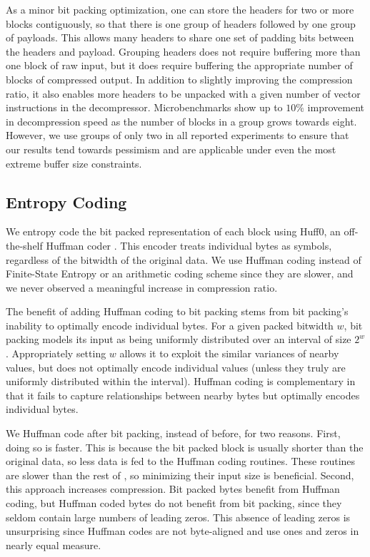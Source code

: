 As a minor bit packing optimization, one can store the headers for two or more blocks contiguously, so that there is one group of headers followed by one group of payloads. This allows many headers to share one set of padding bits between the headers and payload. Grouping headers does not require buffering more than one block of raw input, but it does require buffering the appropriate number of blocks of compressed output. In addition to slightly improving the compression ratio, it also enables more headers to be unpacked with a given number of vector instructions in the decompressor. Microbenchmarks show up to $10\%$ improvement in decompression speed as the number of blocks in a group grows towards eight. However, we use groups of only two in all reported experiments to ensure that our results tend towards pessimism and are applicable under even the most extreme buffer size constraints.

\subsection{Entropy Coding}

We entropy code the bit packed representation of each block using Huff0, an off-the-shelf Huffman coder \cite{fse}. This encoder treats individual bytes as symbols, regardless of the bitwidth of the original data. We use Huffman coding instead of Finite-State Entropy \cite{fse} or an arithmetic coding scheme since they are slower, and we never observed a meaningful increase in compression ratio.

The benefit of adding Huffman coding to bit packing stems from bit packing's inability to optimally encode individual bytes. For a given packed bitwidth $w$, bit packing models its input as being uniformly distributed over an interval of size $2^{w}$. Appropriately setting $w$ allows it to exploit the similar variances of nearby values, but does not optimally encode individual values (unless they truly are uniformly distributed within the interval). Huffman coding is complementary in that  it fails to capture relationships between nearby bytes but optimally encodes individual bytes.

We Huffman code after bit packing, instead of before, for two reasons. First, doing so is faster. This is because the bit packed block is usually shorter than the original data, so less data is fed to the Huffman coding routines. These routines are slower than the rest of \mine, so minimizing their input size is beneficial. Second, this approach increases compression. Bit packed bytes benefit from Huffman coding, but Huffman coded bytes do not benefit from bit packing, since they seldom contain large numbers of leading zeros. This absence of leading zeros is unsurprising since Huffman codes are not byte-aligned and use ones and zeros in nearly equal measure.


